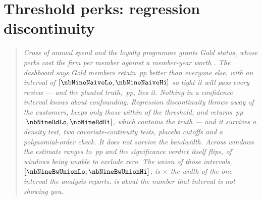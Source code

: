 %
\chapter{Threshold perks: regression discontinuity}
\label{ch:rdd}

\begin{quote}\small
\emph{Cross \eur{\nbNineCutoff} of annual spend and the loyalty programme grants Gold status, whose
perks cost the firm \eur{\nbNinePerkCost} per member against a member-year worth
\eur{\nbNineAnnualValue}. The dashboard says Gold members retain \nbNineNaive{}\,pp better than
everyone else, with an interval of $[\nbNineNaiveLo, \nbNineNaiveHi]$ so tight it will pass every
review --- and the planted truth, \nbNineTrueJump{}\,pp, lies \nbNineNaiveVerdict{} it. Nothing in a
confidence interval knows about confounding. Regression discontinuity throws away
\nbNineRdDropped{} of the \nbNineN{} customers, keeps only those within \eur{\nbNineH} of the
threshold, and returns \nbNineRd{}\,pp $[\nbNineRdLo, \nbNineRdHi]$, which contains the truth ---
and it survives a density test, two covariate-continuity tests, \nbNinePlaceboN{} placebo cutoffs
and a polynomial-order check. It does not survive the bandwidth. Across \nbNineBwNWindows{}
windows the estimate ranges \nbNineBwEstLo{} to \nbNineBwEstHi{}\,pp and the significance verdict
itself flips, \nbNineBwNInsignif{} of \nbNineBwNWindows{} windows being unable to exclude zero. The
union of those intervals, $[\nbNineBwUnionLo, \nbNineBwUnionHi]$, is
\nbNineBwUnionOverWidth$\times$ the width of the one interval the analysis reports.
 is about the number that interval is not showing you.}
\end{quote}

